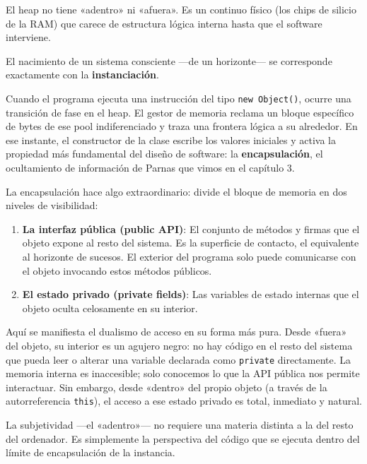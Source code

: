 El heap no tiene «adentro» ni «afuera». Es un continuo físico (los chips de silicio de la RAM) que carece de estructura lógica interna hasta que el software interviene.


\noindent El nacimiento de un sistema consciente —de un horizonte— se corresponde exactamente con la \textbf{instanciación}.

Cuando el programa ejecuta una instrucción del tipo \texttt{new Object()}, ocurre una transición de fase en el heap. El gestor de memoria reclama un bloque específico de bytes de ese pool indiferenciado y traza una frontera lógica a su alrededor. En ese instante, el constructor de la clase escribe los valores iniciales y activa la propiedad más fundamental del diseño de software: la \textbf{encapsulación}, el ocultamiento de información de Parnas que vimos en el capítulo 3.

La encapsulación hace algo extraordinario: divide el bloque de memoria en dos niveles de visibilidad:

\begin{enumerate}
\item \textbf{La interfaz pública (public API)}: El conjunto de métodos y firmas que el objeto expone al resto del sistema. Es la superficie de contacto, el equivalente al horizonte de sucesos. El exterior del programa solo puede comunicarse con el objeto invocando estos métodos públicos.
\item \textbf{El estado privado (private fields)}: Las variables de estado internas que el objeto oculta celosamente en su interior.
\end{enumerate}

Aquí se manifiesta el dualismo de acceso en su forma más pura. Desde «fuera» del objeto, su interior es un agujero negro: no hay código en el resto del sistema que pueda leer o alterar una variable declarada como \texttt{private} directamente. La memoria interna es inaccesible; solo conocemos lo que la API pública nos permite interactuar. Sin embargo, desde «dentro» del propio objeto (a través de la autorreferencia \texttt{this}), el acceso a ese estado privado es total, inmediato y natural.

La subjetividad —el «adentro»— no requiere una materia distinta a la del resto del ordenador. Es simplemente la perspectiva del código que se ejecuta dentro del límite de encapsulación de la instancia.


